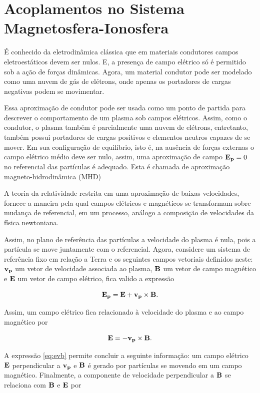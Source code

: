 \section{Acoplamentos no Sistema Magnetosfera-Ionosfera}

É conhecido da eletrodinâmica clássica que em materiais condutores campos eletroestáticos devem ser nulos. E, a presença de campo elétrico só é permitido sob a ação de forças dinâmicas. Agora, um material condutor pode ser modelado como uma nuvem de gás de elétrons, onde apenas os portadores de cargas negativas podem se movimentar.

Essa aproximação de condutor pode ser usada como um ponto de partida para descrever o comportamento de um plasma sob campos elétricos. Assim, como o condutor, o plasma também é parcialmente uma nuvem de elétrons, entretanto, também possui portadores de cargas positivos e elementos neutros capazes de se mover. Em sua configuração de equilíbrio, isto é, na ausência de forças externas o campo elétrico médio deve ser nulo, assim, uma aproximação de campo ${\bf E_p}=0$ no referencial das partículas é adequado. Esta é chamada de aproximação magneto-hidrodinâmica (MHD) \cite{ROEDERER:1979} 

A teoria da relatividade restrita em uma aproximação de baixas velocidades, fornece a maneira pela qual campos elétricos e magnéticos se transformam sobre mudança de referencial, em um processo, análogo a composição de velocidades da física newtoniana.

Assim, no plano de referência das partículas a velocidade do plasma é nula, pois a partícula se move juntamente com o referencial. Agora, considere um sistema de referência fixo em relação a Terra e os seguintes campos vetoriais definidos neste: ${\bf v_p}$ um vetor de velocidade associada ao plasma, ${\bf B}$ um vetor de campo magnético e ${\bf E}$ um vetor de campo elétrico, fica valido a expressão

\begin{equation}
{\bf E_p}= {\bf E}+{\bf v_p}\times{\bf B}\mbox{.}
\end{equation}

Assim, um campo elétrico fica relacionado à velocidade do plasma e ao campo magnético por

\begin{equation}\label{eq:evb}
{\bf E}=-{\bf v_p}\times{\bf B}\mbox{.}
\end{equation}

A expressão \eqref{eq:evb} permite concluir a seguinte informação: um campo elétrico ${\bf E}$ perpendicular a ${\bf v_p}$ e ${\bf B}$ é gerado por partículas se movendo em um campo magnético. Finalmente, a componente de velocidade perpendicular a ${\bf B}$ se relaciona com ${\bf B}$ e ${\bf E}$ por

